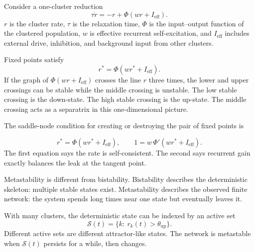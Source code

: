 Consider a one-cluster reduction
%
\begin{equation}
  \tau \dot r
  =
  -r+\Phi(wr+I_{\mathrm{eff}}).
  \label{eq:one-cluster-bistability}
\end{equation}
%
$r$ is the cluster rate, $\tau$ is the relaxation time, $\Phi$ is the input--output function of the clustered population, $w$ is effective recurrent self-excitation, and $I_{\mathrm{eff}}$ includes external drive, inhibition, and background input from other clusters.

Fixed points satisfy
%
\begin{equation}
  r^*
  =
  \Phi(wr^*+I_{\mathrm{eff}}).
  \label{eq:one-cluster-fixed-point}
\end{equation}
%
If the graph of $\Phi(wr+I_{\mathrm{eff}})$ crosses the line $r$ three times, the lower and upper crossings can be stable while the middle crossing is unstable. The low stable crossing is the down-state. The high stable crossing is the up-state. The middle crossing acts as a separatrix in this one-dimensional picture.

The saddle-node condition for creating or destroying the pair of fixed points is
%
\begin{keyequation}
\begin{equation}
  r^*
  =
  \Phi(wr^*+I_{\mathrm{eff}}),
  \qquad
  1
  =
  w\,\Phi'(wr^*+I_{\mathrm{eff}}).
  \label{eq:upstate-saddle-node-condition}
\end{equation}
\tcblower
The first equation says the rate is self-consistent. The second says recurrent gain exactly balances the leak at the tangent point.
\end{keyequation}

\noindent Metastability is different from bistability. Bistability describes the deterministic skeleton: multiple stable states exist. Metastability describes the observed finite network: the system spends long times near one state but eventually leaves it.

With many clusters, the deterministic state can be indexed by an active set
%
\begin{equation}
  \mathcal{S}(t)
  =
  \{k:\ r_k(t)>\theta_{\mathrm{up}}\}.
  \label{eq:active-cluster-set}
\end{equation}
%
Different active sets are different attractor-like states. The network is metastable when $\mathcal{S}(t)$ persists for a while, then changes.

